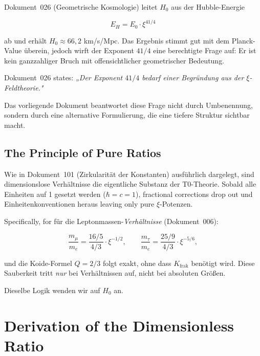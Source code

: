 Dokument~026 (Geometrische Kosmologie) leitet $H_0$ aus der Hubble-Energie

\begin{equation}
    E_H = E_0 \cdot \xi^{41/4}
    \label{eq:EH_026}
\end{equation}

ab und erhält $H_0 \approx 66{,}2$ km/s/Mpc. Das Ergebnis stimmt gut mit dem
Planck-Value überein, jedoch wirft der Exponent $41/4$ eine berechtigte Frage
auf: Er ist kein ganzzahliger Bruch mit offensichtlicher geometrischer
Bedeutung.

Dokument~026 states: \textit{„Der Exponent $41/4$ bedarf einer Begründung
aus der $\xi$-Feldtheorie."}

Das vorliegende Dokument beantwortet diese Frage nicht durch Umbenennung,
sondern durch eine alternative Formulierung, die eine tiefere Struktur
sichtbar macht.

\subsection{The Principle of Pure Ratios}

Wie in Dokument~101 (Zirkularität der Konstanten) ausführlich dargelegt, sind
dimensionslose Verhältnisse die eigentliche Substanz der T0-Theorie. Sobald
alle Einheiten auf 1 gesetzt werden ($\hbar = c = 1$), fractional corrections drop out
und Einheitenkonventionen heraus leaving only pure $\xi$-Potenzen.

Specifically, for für die Leptonmassen-\emph{Verhältnisse} (Dokument~006):

\begin{equation}
    \frac{m_\mu}{m_e} = \frac{16/5}{4/3} \cdot \xi^{-1/2}, \qquad
    \frac{m_\tau}{m_e} = \frac{25/9}{4/3} \cdot \xi^{-5/6},
\end{equation}

und die Koide-Formel $Q = 2/3$ folgt exakt, ohne dass $K_\text{frak}$
benötigt wird. Diese Sauberkeit tritt \emph{nur} bei Verhältnissen auf,
nicht bei absoluten Größen.

Dieselbe Logik wenden wir auf $H_0$ an.

\section{Derivation of the Dimensionless Ratio}
\label{sec:derivation}


